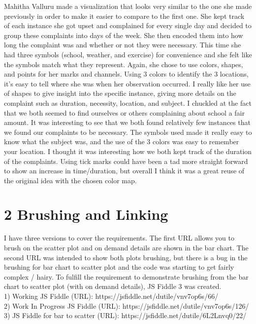 \documentclass{neu_handout}
\begin{document}
Mahitha Valluru made a visualization that looks very similar to the one she made previously in order to make it easier to compare to the first one. She kept track of each instance she got upset and complained for every single day and decided to group these complaints into days of the week. She then encoded them into how long the complaint was and whether or not they were necessary. This time she had three symbols (school, weather, and exercise) for convenience and she felt like the symbols match what they represent. Again, she chose to use colors, shapes, and points for her marks and channels. Using 3 colors to identify the 3 locations, it’s easy to tell where she was when her observation occurred. I really like her use of shapes to give insight into the specific instance, giving more details on the complaint such as duration, necessity, location, and subject. I chuckled at the fact that we both seemed to find ourselves or others complaining about school a fair amount. It was interesting to see that we both found relatively few instances that we found our complaints to be necessary. The symbols used made it really easy to know what the subject was, and the use of the 3 colors was easy to remember your location. I thought it was interesting how we both kept track of the duration of the complaints. Using tick marks could have been a tad more straight forward to show an increase in time/duration, but overall I think it was a great reuse of the original idea with the chosen color map.


\section*{2 Brushing and Linking}

I have three versions to cover the requirements. The first URL allows you to brush on the scatter plot and on demand details are shown in the bar chart. The second URL was intended to show both plots brushing, but there is a bug in the brushing for bar chart to scatter plot and the code was starting to get fairly complex / hairy. To fulfill the requirement to demonstrate brushing from the bar chart to scatter plot (with on demand details), JS Fiddle 3 was created.\\

1) Working JS Fiddle (URL): https://jsfiddle.net/dutile/vnv7op6s/66/\\
2) Work In Progress JS Fiddle (URL): https://jsfiddle.net/dutile/vnv7op6s/126/ \\
3) JS Fiddle for bar to scatter (URL): https://jsfiddle.net/dutile/6L2Lnvq0/22/\\
\end{document}

